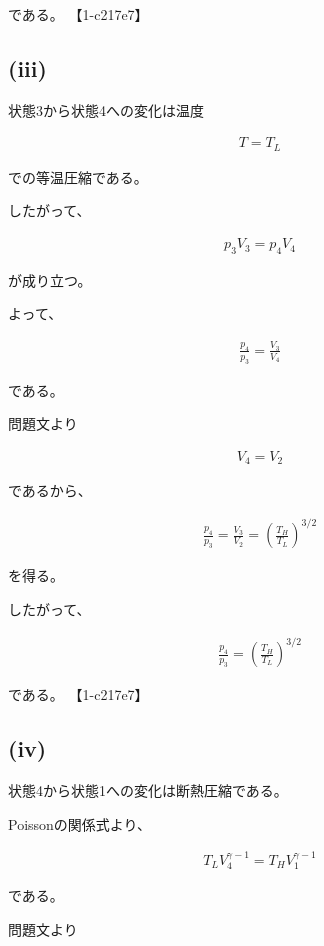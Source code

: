 \documentclass[platex,dvipdfmx,a4paper]{jsarticle}
\begin{document}
である。 【1-c217e7】

\subsection{(iii)}

状態3から状態4への変化は温度

\begin{align*}
T=T_L
\end{align*}

での等温圧縮である。

したがって、

\begin{align*}
p_3V_3
=
p_4V_4
\end{align*}

が成り立つ。

よって、

\begin{align*}
\frac{p_4}{p_3}
=
\frac{V_3}{V_4}
\end{align*}

である。

問題文より

\begin{align*}
V_4=V_2
\end{align*}

であるから、

\begin{align*}
\frac{p_4}{p_3}
=
\frac{V_3}{V_2}
=
\left(
\frac{T_H}{T_L}
\right)^{3/2}
\end{align*}

を得る。

したがって、

\begin{align*}
\frac{p_4}{p_3}
=
\left(
\frac{T_H}{T_L}
\right)^{3/2}
\end{align*}

である。 【1-c217e7】

\subsection{(iv)}

状態4から状態1への変化は断熱圧縮である。

Poissonの関係式より、

\begin{align*}
T_LV_4^{\gamma-1}
=
T_HV_1^{\gamma-1}
\end{align*}

である。

問題文より
\end{document}
